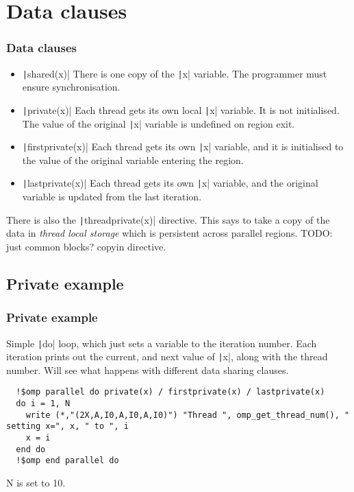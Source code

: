 \documentclass{beamer}
\begin{document}
\section{Data clauses}
\begin{frame}
\frametitle{Data clauses}
\begin{itemize}
  \item \texttt|shared(x)|
    There is one copy of the \texttt|x| variable. The programmer must ensure synchronisation.
  \item \texttt|private(x)|
    Each thread gets its own local \texttt|x| variable. It is not initialised. The value of the original \texttt|x| variable is undefined on region exit.
  \item \texttt|firstprivate(x)|
    Each thread gets its own \texttt|x| variable, and it is initialised to the value of the original variable entering the region.
  \item \texttt|lastprivate(x)|
    Each thread gets its own \texttt|x| variable, and the original variable is updated from the last iteration.
\end{itemize}

There is also the \texttt|threadprivate(x)| directive.
This says to take a copy of the data in \emph{thread local storage} which is persistent across parallel regions.
TODO: just common blocks? copyin directive.
\end{frame}

\subsection{Private example}
\begin{frame}[fragile]
\frametitle{Private example}
Simple \texttt|do| loop, which just sets a variable to the iteration number.
Each iteration prints out the current, and next value of \texttt|x|, along with the thread number.
Will see what happens with different data sharing clauses.

\begin{verbatim}
  !$omp parallel do private(x) / firstprivate(x) / lastprivate(x)
  do i = 1, N
    write (*,"(2X,A,I0,A,I0,A,I0)") "Thread ", omp_get_thread_num(), " setting x=", x, " to ", i
    x = i
  end do
  !$omp end parallel do
\end{verbatim}
N is set to 10.
\end{frame}
\end{document}
